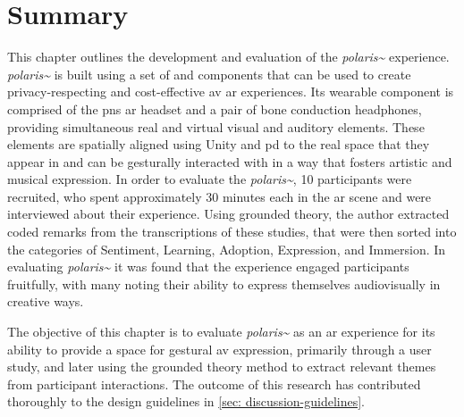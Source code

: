     
\clearpage
   
\section{Summary}\label{sec: polaris-summary}
This chapter outlines the development and evaluation of the \textit{polaris\textasciitilde{}} experience. \textit{polaris\textasciitilde{}} is built using a set of   and  components that can be used to create privacy-respecting and cost-effective \gls{av} \gls{ar} experiences. Its wearable component is comprised of the  \gls{pns} \gls{ar} headset and a pair of bone conduction headphones, providing simultaneous real and virtual visual and auditory elements. These elements are spatially aligned using Unity and \gls{pd} to the real space that they appear in and can be gesturally interacted with in a way that fosters artistic and musical expression. In order to evaluate the \textit{polaris\textasciitilde{}}, 10 participants were recruited, who spent approximately 30 minutes each in the \gls{ar} scene and were interviewed about their experience. Using grounded theory, the author extracted coded remarks from the transcriptions of these studies, that were then sorted into the categories of Sentiment, Learning, Adoption, Expression, and Immersion. In evaluating \textit{polaris\textasciitilde{}} it was found that the experience engaged participants fruitfully, with many noting their ability to express themselves audiovisually in creative ways.

The objective of this chapter is to evaluate \textit{polaris\textasciitilde{}} as an \gls{ar} experience for its ability to provide a space for gestural \gls{av} expression, primarily through a user study, and later using the grounded theory method to extract relevant themes from participant interactions. The outcome of this research has contributed thoroughly to the design guidelines in \autoref{sec: discussion-guidelines}.



